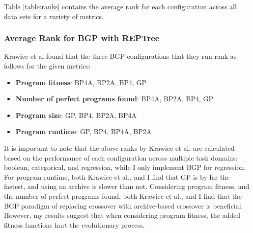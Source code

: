 %

Table \ref{table:ranks} contains the average rank for each configuration across all data sets for a variety of metrics.


\subsubsection{Average Rank for BGP with REPTree}
Krawiec et al found that the three BGP configurations that they run rank as follows for the given metrics:

\begin{itemize}[noitemsep]
\item \textbf{Program fitness}: BP4A, BP2A, BP4, GP
\item \textbf{Number of perfect programs found}: BP4A, BP2A, BP4, GP
\item \textbf{Program size}: GP, BP4, BP2A, BP4A
\item \textbf{Program runtime}: GP, BP4, BP4A, BP2A
\end{itemize}

It is important to note that the above ranks by Krawiec et al. are calculated based on the performance of each configuration across multiple task domains: boolean, categorical, and regression, while I only implement BGP for regression.  For program runtime, both Krawiec et al., and I find that GP is by far the fastest, and using an archive is slower than not.  Considering program fitness, and the number of perfect programs found, both Krawiec et al., and I find that the BGP paradigm of replacing crossover with archive-based crossover is beneficial.  However, my results suggest that when considering program fitness, the added fitness functions hurt the evolutionary process.

